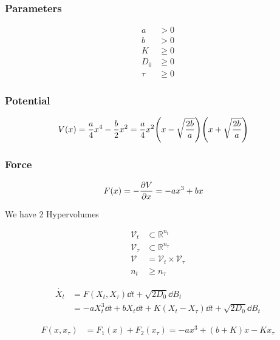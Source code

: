 \documentclass[a4paper,10pt]{article}
\begin{document}
\subsubsection*{Parameters}

\begin{align}
	a&>0
\\
	b&>0
\\
	K&\geq 0
\\
	D_0
	&\geq 0
\\
	\tau
	&\geq 0
\end{align}

\subsubsection*{Potential}

\begin{align}
	V(x)
	&=
	\frac{a}{4}
	x^4
	-
	\frac{b}{2}
	x^2
	=
	\frac{a}{4}
	x^2
	\pqty{
		x-\sqrt{\frac{2b}{a}}
	}
	\pqty{
		x+\sqrt{\frac{2b}{a}}	
	}
\end{align}

\subsubsection*{Force}

\begin{align}
	F(x)
	&=
	-\pdv{V}{x}
	=
	-
	a
	x^3
	+
	b
	x
\end{align}


We have 2 Hypervolumes

\begin{align}
	\mathcal{V}_t
	&\subset
	\mathbb{R}^{n_t}
\\
	\mathcal{V}_\tau
	&\subset
	\mathbb{R}^{n_\tau}
\\
	\mathcal{V}
	&=
	\mathcal{V}_t
	\times
	\mathcal{V}_\tau
\\
	n_t
	&\geq
	n_\tau
\end{align}


\begin{align}
	\dot{X_t}
	&=
	F(X_t,X_\tau)
	\dd{t}
	+
	\sqrt{2D_0}
	\dd{B}_t
\\	
	&=
	-
	a
	X_t^3
	\dd{t}
	+
	b
	X_t
	\dd{t}
	+
	K
	(X_t-X_\tau)
	\dd{t}
	+
	\sqrt{2D_0}
	\dd{B}_t
\end{align}

\begin{align}
	F(x,x_\tau)
	&=
	F_1(x)
	+
	F_2(x_\tau)
	=
	-
	ax^3
	+
	(b+K)x
	-
	Kx_\tau
\end{align}
\end{document}
